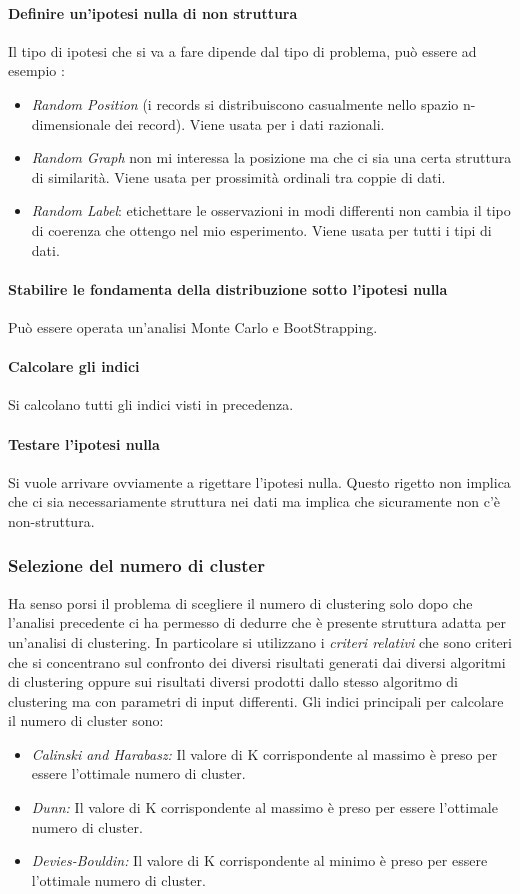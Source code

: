  \paragraph{Definire un'ipotesi nulla di non struttura} Il tipo di ipotesi che si va a fare dipende dal tipo di problema, può essere ad esempio :
 \begin{itemize}
 	\item \textit{Random Position} (i records si distribuiscono casualmente nello spazio n-dimensionale dei record). Viene usata per i dati razionali.
 	\item \textit{Random Graph } non mi interessa la posizione ma che ci sia una certa struttura di similarità. Viene usata per prossimità ordinali tra coppie di dati.
 	\item \textit{Random Label}: etichettare le osservazioni in modi differenti non cambia il tipo di coerenza che ottengo nel mio esperimento. Viene usata per tutti i tipi di dati.
 \end{itemize}
\paragraph{Stabilire le fondamenta della distribuzione sotto l'ipotesi nulla} Può essere operata un'analisi Monte Carlo e BootStrapping.
\paragraph{Calcolare gli indici} Si calcolano tutti gli indici visti in precedenza.
\paragraph{Testare l'ipotesi nulla} Si vuole arrivare ovviamente a rigettare l'ipotesi nulla. Questo rigetto non implica che ci sia necessariamente struttura nei dati ma implica che sicuramente non c'è non-struttura. 
 
 \subsubsection{Selezione del numero di cluster}
 Ha senso porsi il problema di scegliere il numero di clustering solo dopo che l'analisi precedente ci ha permesso di dedurre che è presente struttura adatta per un'analisi di clustering. In particolare si utilizzano i \textit{criteri relativi} che sono criteri che si concentrano sul confronto dei diversi risultati generati dai diversi algoritmi di clustering oppure sui risultati diversi prodotti dallo stesso algoritmo di clustering ma con parametri di input differenti.
 Gli indici principali per calcolare il numero di cluster sono:
 \begin{itemize}
 	\item \textit{Calinski and Harabasz:} Il valore di K corrispondente al massimo è preso per essere l'ottimale numero di cluster.
 	\item \textit{Dunn:} Il valore di K corrispondente al massimo è preso per essere l'ottimale numero di cluster.
 	\item \textit{Devies-Bouldin:} Il valore di K corrispondente al minimo è preso per essere l'ottimale numero di cluster.
 \end{itemize}
 
